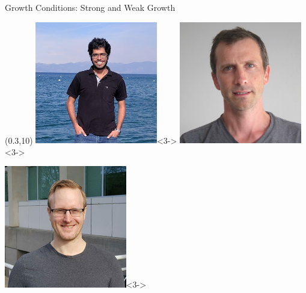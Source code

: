 \documentclass[mathserif,notheorems, hyperref={colorlinks, citecolor=blue, urlcolor=blue, linkcolor=blue}]{beamer}
\begin{document}
\begin{frame}{Growth Conditions: Strong and Weak Growth}
    \begin{textblock}{2.5}(0.3,10)
        \centering
        \includegraphics[width=0.4\textwidth]{collaborators/sharan}<3->
        \includegraphics[width=0.4\textwidth]{collaborators/francis}<3->

        \vspace{0.5ex}

        \includegraphics[width=0.4\textwidth]{collaborators/mark}<3->
    \end{textblock}


    \end{frame}
\end{document}
